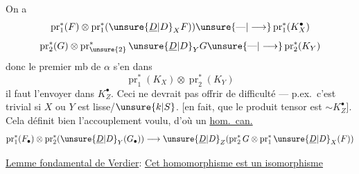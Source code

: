 
On a
\[
\operatorname{pr}_1^*(F)\otimes\operatorname{pr}_1^*(\unsure{\underline{D}|D}_X F))\unsure{\text{---}|\longrightarrow}\operatorname{pr}_1^*(K_X^\bullet)
\]
\[
\operatorname{pr}_2^*(G)\otimes\operatorname{pr}_{\unsure{2}}^*\unsure{\underline{D}|D}_Y G\unsure{\text{---}|\longrightarrow}\operatorname{pr}_2^*(K_Y)
\]
donc le premier mb de \textcircled{\scriptsize$\alpha$} s'en  dans
\[
\operatorname{pr}_1^*(K_X)\otimes\operatorname{pr}_2^*(K_Y)
\]
il faut l'envoyer  dans $K_Z^\bullet$. Ceci ne devrait pas offrir de difficulté --- p.ex.\ c'est trivial si $X$ ou $Y$ est lisse/$\unsure{k|S}$.
[en fait,  que le produit tensor est $\sim K_Z^\bullet$].
Cela définit bien l'accouplement voulu, d'où un \uline{hom.\ can.}
\margin{\textcircled{**}}
\[
\operatorname{pr}_1^*(F_\bullet)\otimes\operatorname{pr}_2^*(\unsure{\underline{D}|D}_Y(G_\bullet))\longrightarrow\unsure{\underline{D}|D}_Z(\operatorname{pr}_2^*G\otimes\operatorname{pr}_1^*\unsure{\underline{D}|D}_X(F))
\]

\uline{Lemme fondamental de Verdier}: \uline{Cet homomorphisme est un isomorphisme}

